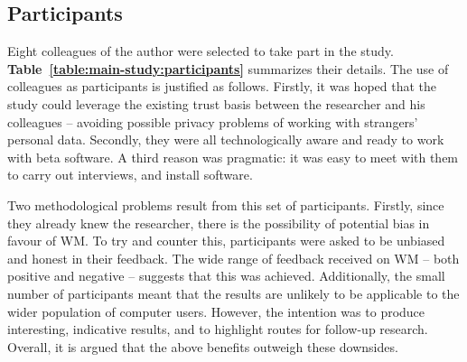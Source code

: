 \subsection{Participants}
\label{main-study:method-users}


Eight colleagues of the author were selected to take part in the study.  \textbf{Table~\ref{table:main-study:participants}} summarizes their details.
The use of colleagues as participants is justified as follows.
Firstly, it was hoped that the study could leverage the existing trust basis between the researcher and his colleagues -- avoiding possible privacy problems of working with strangers' personal data.
Secondly, they were all technologically aware and ready to work with beta software.
A third reason was pragmatic: it was easy to meet with them to carry out interviews, and install software.

Two methodological problems result from this set of participants.  Firstly, since they already knew the researcher, there is the possibility of potential bias in favour of WM.  To try and counter this, participants were asked to be unbiased and honest in their feedback. The wide range of feedback received on WM -- both positive and negative -- suggests that this was achieved.  Additionally, the small number of participants meant that the results are unlikely to be applicable to the wider population of computer users.  However, the intention was to produce interesting, indicative results, and to highlight routes for follow-up research. Overall, it is argued that the above benefits outweigh these downsides.   %

